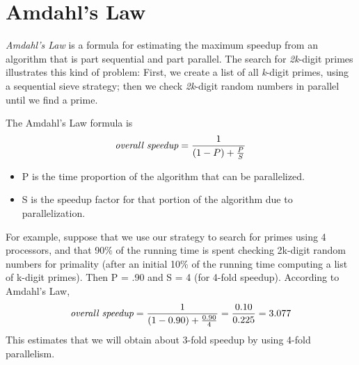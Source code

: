 \documentclass[letterpaper,10pt,openany,oneside]{sphinxmanual}
\begin{document}
\section{Amdahl's Law}
\label{ParallelSpeedup/ParallelSpeedup:amdahl-s-law}
\emph{Amdahl's Law} is a formula for estimating the maximum speedup from an algorithm that is part sequential and part parallel.  The search for \emph{2k}-digit primes illustrates this kind of problem: First, we create a list of all \emph{k}-digit primes, using a sequential sieve strategy; then we check \emph{2k}-digit random numbers in parallel until we find a prime.

The Amdahl's Law formula is
\begin{gather}
\begin{split}\textit{overall speedup} = \frac{1}{(1-P) +  \frac{P}{S}}\end{split}\notag
\end{gather}\begin{itemize}
\item {} 
P is the time proportion of the algorithm that can be parallelized.

\item {} 
S is the speedup factor for that portion of the algorithm due to parallelization.

\end{itemize}

For example, suppose that we use our strategy to search for primes using 4 processors, and that 90\% of the running time is spent checking 2k-digit random numbers for primality (after an initial 10\% of the running time computing a list of k-digit primes). Then P = .90 and S = 4 (for 4-fold speedup).  According to Amdahl's Law,
\begin{gather}
\begin{split}\textit{overall speedup} = \frac{1}{(1-0.90) + \frac{0.90}{4}} = \frac{0.10}{0.225} = 3.077\end{split}\notag
\end{gather}
This estimates that we will obtain about 3-fold speedup by using 4-fold parallelism.
\end{document}
